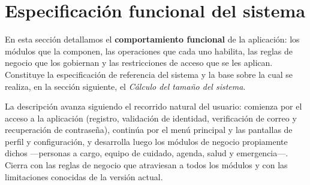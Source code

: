\documentclass[a4paper,12pt]{article}
\begin{document}
    \section{Especificación funcional del sistema}
    \par En esta sección detallamos el \textbf{comportamiento funcional} de la aplicación: los módulos que la componen, las operaciones que cada uno habilita, las reglas de negocio que los gobiernan y las restricciones de acceso que se les aplican. Constituye la especificación de referencia del sistema y la base sobre la cual se realiza, en la sección siguiente, el \textit{Cálculo del tamaño del sistema}.
    \par La descripción avanza siguiendo el recorrido natural del usuario: comienza por el acceso a la aplicación (registro, validación de identidad, verificación de correo y recuperación de contraseña), continúa por el menú principal y las pantallas de perfil y configuración, y desarrolla luego los módulos de negocio propiamente dichos —personas a cargo, equipo de cuidado, agenda, salud y emergencia—. Cierra con las reglas de negocio que atraviesan a todos los módulos y con las limitaciones conocidas de la versión actual.
\end{document}
